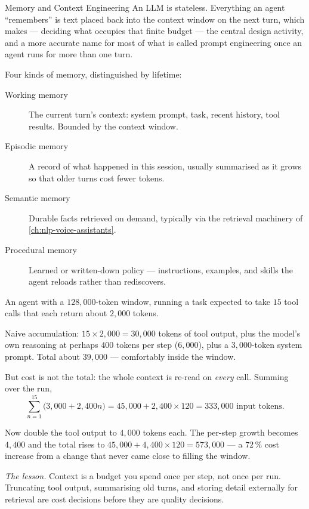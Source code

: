 \begin{v3topic}{Memory and Context Engineering}
    An LLM is stateless. Everything an agent ``remembers'' is text placed back
    into the context window on the next turn, which makes
     --- deciding what occupies that finite budget
    --- the central design activity, and a more accurate name for most of what
    is called prompt engineering once an agent runs for more than one turn.

    Four kinds of memory, distinguished by lifetime:
    \begin{description}
      \item[Working memory] The current turn's context: system prompt, task,
        recent history, tool results. Bounded by the context window.
      \item[Episodic memory] A record of what happened in this session,
        usually summarised as it grows so that older turns cost fewer tokens.
      \item[Semantic memory] Durable facts retrieved on demand, typically via
        the retrieval machinery of \cref{ch:nlp-voice-assistants}.
      \item[Procedural memory] Learned or written-down policy --- instructions,
        examples, and skills the agent reloads rather than rediscovers.
    \end{description}

\begin{workedexample}
An agent with a $128{,}000$-token window, running a task expected to take
$15$ tool calls that each return about $2{,}000$ tokens.

Naive accumulation: $15 \times 2{,}000 = 30{,}000$ tokens of tool output, plus
the model's own reasoning at perhaps $400$ tokens per step ($6{,}000$), plus a
$3{,}000$-token system prompt. Total about $39{,}000$ --- comfortably inside the
window.

But cost is not the total: the whole context is re-read on \emph{every} call.
Summing over the run,
\[
  \sum_{n=1}^{15}\bigl(3{,}000 + 2{,}400n\bigr)
  = 45{,}000 + 2{,}400\times120 = 333{,}000 \text{ input tokens.}
\]

Now double the tool output to $4{,}000$ tokens each. The per-step growth
becomes $4{,}400$ and the total rises to
$45{,}000 + 4{,}400\times120 = 573{,}000$ --- a $72\,\%$ cost increase from a
change that never came close to filling the window.

\emph{The lesson.} Context is a budget you spend once per step, not once per
run. Truncating tool output, summarising old turns, and storing detail
externally for retrieval are cost decisions before they are quality decisions.
\end{workedexample}
\end{v3topic}

